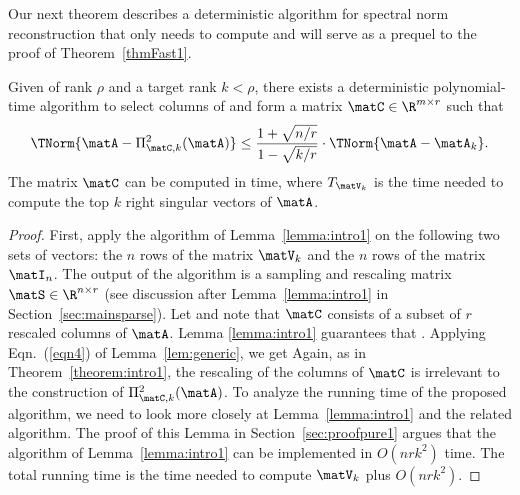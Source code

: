 Our next theorem describes a deterministic algorithm for spectral norm reconstruction that only needs to compute  and will serve as a prequel to the proof of Theorem~\ref{thmFast1}.
\begin{theorem}\label{theorem:spectralIn}
Given  of rank $\rho$ and a target rank $k < \rho$, there exists a deterministic polynomial-time algorithm to select  columns of \math{\matA} and form a matrix
$\matC\in\R^{m \times r}$ such that
$$\TNorm{\matA - \Pi_{\matC,k}^2(\matA)} \leq
\frac{1 + \sqrt{ n/r }}{1 - \sqrt{ k/r }} \cdot \TNorm{\matA-\matA_k}.$$
The matrix $\matC$ can be computed in  time, where $T_{\matV_k}$ is the time needed to compute the top $k$ right singular vectors of $\matA$.
\end{theorem}
\begin{proof}
First, apply the algorithm of Lemma~\ref{lemma:intro1}
on the following two sets of vectors: the $n$ rows of the matrix
$\matV_k$ and the $n$ rows of the matrix $\matI_n$. The output of the algorithm is a sampling and rescaling matrix $\matS \in {\R}^{n \times r}$ (see discussion after Lemma~\ref{lemma:intro1} in Section~\ref{sec:mainsparse}). Let \math{\matC=\matA \matS} and note that $\matC$ consists of a subset of $r$ rescaled
 columns of $\matA$. Lemma \ref{lemma:intro1} guarantees that . Applying Eqn.~(\ref{eqn4}) of Lemma~\ref{lem:generic}, we get
Again, as in Theorem~\ref{theorem:intro1}, the rescaling of the columns of $\matC$ is irrelevant to the construction of $\Pi_{\matC,k}^2(\matA)$. To analyze the running time of the proposed algorithm, we need to look more closely at Lemma~\ref{lemma:intro1} and the related algorithm. The proof of this Lemma in Section~\ref{sec:proofpure1} argues that the algorithm of Lemma~\ref{lemma:intro1} can be implemented in $O(nrk^2)$ time. The total running time is the time needed to compute $\matV_k$ plus $O(nrk^2)$.
\end{proof}

